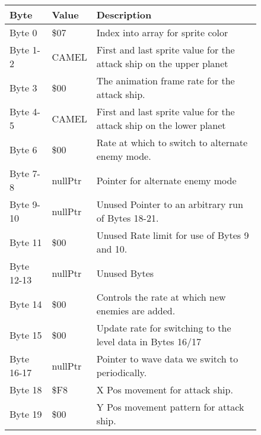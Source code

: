 \begin{figure}[H]
  {
  \setlength{\tabcolsep}{3.0pt}
  \setlength\cmidrulewidth{\heavyrulewidth} %
  \begin{adjustbox}{width=12cm}

\begin{tabular}{lll}
\toprule
 Byte       & Value                      & Description                                                         \\
\midrule
 Byte 0     & \$07                        & Index into array for sprite color                                   \\
 Byte 1-2   & CAMEL                      & First and last sprite value for the attack ship on the upper planet \\
 Byte 3     & \$00                        & The animation frame rate for the attack ship.                       \\
 Byte 4-5   & CAMEL                      & First and last sprite value for the attack ship on the lower planet \\
 Byte 6     & \$00                        & Rate at which to switch to alternate enemy mode.                    \\
 Byte 7-8   & nullPtr                    & Pointer for alternate enemy mode                                    \\
 Byte 9-10  & nullPtr                    & Unused Pointer to an arbitrary run of Bytes 18-21.                  \\
 Byte 11    & \$00                        & Unused Rate limit for use of Bytes 9 and 10.                        \\
 Byte 12-13 & nullPtr                    & Unused Bytes                                                        \\
 Byte 14    & \$00                        & Controls the rate at which new enemies are added.                   \\
 Byte 15    & \$00                        & Update rate for switching to the level data in Bytes 16/17          \\
 Byte 16-17 & nullPtr                    & Pointer to wave data we switch to periodically.                     \\
 Byte 18    & \$F8                        & X Pos movement for attack ship.                                     \\
 Byte 19    & \$00                        & Y Pos movement pattern for attack ship.                             \\

\end{tabular}
\end{adjustbox}}
\end{figure}
